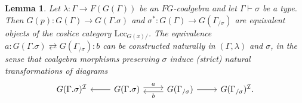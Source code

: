 \documentclass{article}
\newtheorem{lemma}{Lemma}
\theoremstyle{remark}
\theoremstyle{definition}
\begin{document}
\begin{lemma}
  \label{lem:extension-vs-slice}
  Let $\lambda : \Gamma \rightarrow F(G(\Gamma))$ be an $FG$-coalgebra and let $\Gamma \vdash \sigma$ be a type.
  Then $G(p) : G(\Gamma) \rightarrow G(\Gamma.\sigma)$ and $\sigma^* : G(\Gamma) \rightarrow G(\Gamma_{/ \sigma})$ are equivalent objects of the coslice category $\mathrm{Lcc}_{G(x) /}$.
  The equivalence $a : G(\Gamma.\sigma) \rightleftarrows G(\Gamma_{/ \sigma}) : b$ can be constructed naturally in $(\Gamma, \lambda)$ and $\sigma$, in the sense that coalgebra morphisms preserving $\sigma$ induce (strict) natural transformations of diagrams
  \begin{equation}
    \label{eq:ext-equivalence}
    \begin{tikzcd}
      G(\Gamma.\sigma)^\mathcal{I} & G(\Gamma.\sigma) \arrow[r, shift left, "a"] \arrow[l] & G(\Gamma_{/ \sigma}) \arrow[l, shift left, "b"] \arrow[r] & G(\Gamma_{/ \sigma})^\mathcal{I}.
    \end{tikzcd}
  \end{equation}
\end{lemma}
\end{document}
